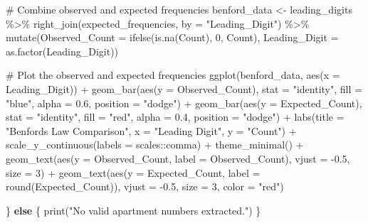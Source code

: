 \documentclass[
  12pt,
]{article}
\newenvironment{Shaded}{\begin{snugshade}}{\end{snugshade}}
\newcommand{\AttributeTok}[1]{\textcolor[rgb]{0.40,0.45,0.13}{#1}}
\newcommand{\CommentTok}[1]{\textcolor[rgb]{0.37,0.37,0.37}{#1}}
\newcommand{\ControlFlowTok}[1]{\textcolor[rgb]{0.00,0.23,0.31}{\textbf{#1}}}
\newcommand{\DecValTok}[1]{\textcolor[rgb]{0.68,0.00,0.00}{#1}}
\newcommand{\FloatTok}[1]{\textcolor[rgb]{0.68,0.00,0.00}{#1}}
\newcommand{\FunctionTok}[1]{\textcolor[rgb]{0.28,0.35,0.67}{#1}}
\newcommand{\NormalTok}[1]{\textcolor[rgb]{0.00,0.23,0.31}{#1}}
\newcommand{\OtherTok}[1]{\textcolor[rgb]{0.00,0.23,0.31}{#1}}
\newcommand{\SpecialCharTok}[1]{\textcolor[rgb]{0.37,0.37,0.37}{#1}}
\newcommand{\StringTok}[1]{\textcolor[rgb]{0.13,0.47,0.30}{#1}}
\begin{document}
\begin{Shaded}
\begin{Highlighting}[]
    \CommentTok{\# Combine observed and expected frequencies}
\NormalTok{    benford\_data }\OtherTok{\textless{}{-}}\NormalTok{ leading\_digits }\SpecialCharTok{\%\textgreater{}\%}
      \FunctionTok{right\_join}\NormalTok{(expected\_frequencies, }\AttributeTok{by =} \StringTok{"Leading\_Digit"}\NormalTok{) }\SpecialCharTok{\%\textgreater{}\%}
      \FunctionTok{mutate}\NormalTok{(}\AttributeTok{Observed\_Count =} \FunctionTok{ifelse}\NormalTok{(}\FunctionTok{is.na}\NormalTok{(Count), }\DecValTok{0}\NormalTok{, Count),}
             \AttributeTok{Leading\_Digit =} \FunctionTok{as.factor}\NormalTok{(Leading\_Digit))}

    \CommentTok{\# Plot the observed and expected frequencies}
    \FunctionTok{ggplot}\NormalTok{(benford\_data, }\FunctionTok{aes}\NormalTok{(}\AttributeTok{x =}\NormalTok{ Leading\_Digit)) }\SpecialCharTok{+}
      \FunctionTok{geom\_bar}\NormalTok{(}\FunctionTok{aes}\NormalTok{(}\AttributeTok{y =}\NormalTok{ Observed\_Count), }\AttributeTok{stat =} \StringTok{"identity"}\NormalTok{, }\AttributeTok{fill =} \StringTok{"blue"}\NormalTok{, }\AttributeTok{alpha =} \FloatTok{0.6}\NormalTok{, }\AttributeTok{position =} \StringTok{"dodge"}\NormalTok{) }\SpecialCharTok{+}
      \FunctionTok{geom\_bar}\NormalTok{(}\FunctionTok{aes}\NormalTok{(}\AttributeTok{y =}\NormalTok{ Expected\_Count), }\AttributeTok{stat =} \StringTok{"identity"}\NormalTok{, }\AttributeTok{fill =} \StringTok{"red"}\NormalTok{, }\AttributeTok{alpha =} \FloatTok{0.4}\NormalTok{, }\AttributeTok{position =} \StringTok{"dodge"}\NormalTok{) }\SpecialCharTok{+}
      \FunctionTok{labs}\NormalTok{(}\AttributeTok{title =} \StringTok{"Benford\textquotesingle{}s Law Comparison"}\NormalTok{,}
           \AttributeTok{x =} \StringTok{"Leading Digit"}\NormalTok{,}
           \AttributeTok{y =} \StringTok{"Count"}\NormalTok{) }\SpecialCharTok{+}
      \FunctionTok{scale\_y\_continuous}\NormalTok{(}\AttributeTok{labels =}\NormalTok{ scales}\SpecialCharTok{::}\NormalTok{comma) }\SpecialCharTok{+}
      \FunctionTok{theme\_minimal}\NormalTok{() }\SpecialCharTok{+}
      \FunctionTok{geom\_text}\NormalTok{(}\FunctionTok{aes}\NormalTok{(}\AttributeTok{y =}\NormalTok{ Observed\_Count, }\AttributeTok{label =}\NormalTok{ Observed\_Count), }\AttributeTok{vjust =} \SpecialCharTok{{-}}\FloatTok{0.5}\NormalTok{, }\AttributeTok{size =} \DecValTok{3}\NormalTok{) }\SpecialCharTok{+}
      \FunctionTok{geom\_text}\NormalTok{(}\FunctionTok{aes}\NormalTok{(}\AttributeTok{y =}\NormalTok{ Expected\_Count, }\AttributeTok{label =} \FunctionTok{round}\NormalTok{(Expected\_Count)), }\AttributeTok{vjust =} \SpecialCharTok{{-}}\FloatTok{0.5}\NormalTok{, }\AttributeTok{size =} \DecValTok{3}\NormalTok{, }\AttributeTok{color =} \StringTok{"red"}\NormalTok{)}

\NormalTok{\} }\ControlFlowTok{else}\NormalTok{ \{}
    \FunctionTok{print}\NormalTok{(}\StringTok{"No valid apartment numbers extracted."}\NormalTok{)}
\NormalTok{\}}
\end{Highlighting}
\end{Shaded}
\end{document}
